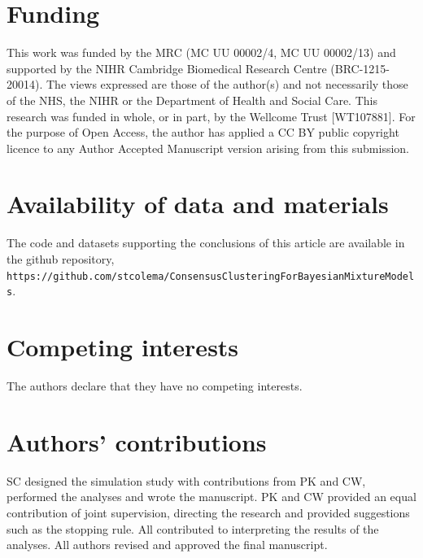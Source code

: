 \documentclass{bmcart}
\begin{document}
\begin{backmatter}
		
	\section*{Funding}%
	This work was funded by the MRC (MC UU 00002/4, MC UU 00002/13) and supported by the NIHR Cambridge Biomedical Research Centre (BRC-1215-20014). The views expressed are those of the author(s) and not necessarily those of the NHS, the NIHR or the Department of Health and Social Care. This research was funded in whole, or in part, by the Wellcome Trust [WT107881]. For the purpose of Open Access, the author has applied a CC BY public copyright licence to any Author Accepted Manuscript version arising from this submission.
	
	
	\section*{Availability of data and materials}%
	The code and datasets supporting the conclusions of this article are available in the github repository, \texttt{https://github.com/stcolema/ConsensusClusteringForBayesianMixtureModels}.

	\section*{Competing interests}
	The authors declare that they have no competing interests.
	
	
	\section*{Authors' contributions}
	SC designed the simulation study with contributions from PK and CW, performed the analyses and wrote the manuscript. PK and CW provided an equal contribution of joint supervision, directing the research and provided suggestions such as the stopping rule. All contributed to interpreting the results of the analyses. All authors revised and approved the final manuscript.
	

\end{backmatter}
\end{document}
